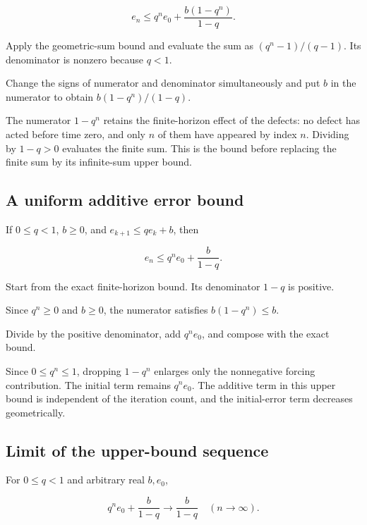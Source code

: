 \documentclass[11pt,a4paper]{report}
\begin{document}
\[e_n\le q^ne_0+\frac{b(1-q^n)}{1-q}.\]

Apply the geometric-sum bound and evaluate the sum as \((q^n-1)/(q-1)\). Its denominator is nonzero because \(q<1\).



Change the signs of numerator and denominator simultaneously and put \(b\) in the numerator to obtain \(b(1-q^n)/(1-q)\).



The numerator \(1-q^n\) retains the finite-horizon effect of the defects: no defect has acted before time zero, and only \(n\) of them have appeared by index \(n\). Dividing by \(1-q>0\) evaluates the finite sum. This is the bound before replacing the finite sum by its infinite-sum upper bound.

\subsection{\texorpdfstring{A uniform additive error bound}{A uniform additive error bound}}
\label{report-step-UnadjustedLangevin-Recurrence-lean-3}


If \(0\le q<1\), \(b\ge0\), and \(e_{k+1}\le qe_k+b\), then

\[e_n\le q^ne_0+\frac b{1-q}.\]

Start from the exact finite-horizon bound. Its denominator \(1-q\) is positive.



Since \(q^n\ge0\) and \(b\ge0\), the numerator satisfies \(b(1-q^n)\le b\).



Divide by the positive denominator, add \(q^ne_0\), and compose with the exact bound.



Since \(0\le q^n\le1\), dropping \(1-q^n\) enlarges only the nonnegative forcing contribution. The initial term remains \(q^ne_0\). The additive term in this upper bound is independent of the iteration count, and the initial-error term decreases geometrically.

\subsection{\texorpdfstring{Limit of the upper-bound sequence}{Limit of the upper-bound sequence}}
\label{report-step-UnadjustedLangevin-Recurrence-lean-4}


For \(0\le q<1\) and arbitrary real \(b,e_0\),

\[q^ne_0+\frac b{1-q}\longrightarrow\frac b{1-q}\quad(n\to\infty).\]
\end{document}

